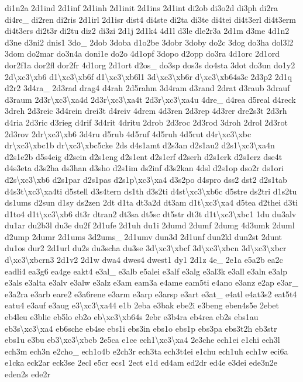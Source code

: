 {di1n2a 2d1ind 2d1inf 2d1inh 2d1init 2d1ins 2d1int di2ob di3o2d di3ph di2ra di4re\-\_\- di2ren di2ris 2d1irl 2d1isr dist4 di4ste di2ta di3te di4tei di4t3erl di4t3erm di4t3ers di2t3r di2tu diz2 di3zi 2d1j 2d1k4 4d1l d3le dle2r3a 2d1m d3me 4d1n2 d3ne d3ni2 dnis1 3do\-\_\- 2dob 3doba d1o2be 3dobr 3doby do2c 3dog do3ha dol3l2 3dom do2mar do3n4a doni1e do2o 4d1opf 3dopo d2opp do3ra 4d1orc 2d1ord dor2f1a dor2fl dor2fr 4d1org 2d1ort d2os\-\_\- do3sp dos3s do4sta 3dot do3un do1y2 2d\textbackslash{}xc3\textbackslash{}xb6 d1\textbackslash{}xc3\textbackslash{}xb6f d1\textbackslash{}xc3\textbackslash{}xb6l1 3d\textbackslash{}xc3\textbackslash{}xb6r d\textbackslash{}xc3\textbackslash{}xb64s3c 2d3p2 2d1q d2r2 3d4ra\-\_\- 2d3rad drag4 d4rah 2d5rahm 3d4ram d3rand 2drat d3raub 3drauf d3raum 2d3r\textbackslash{}xc3\textbackslash{}xa4d 2d3r\textbackslash{}xc3\textbackslash{}xa4t 2d3r\textbackslash{}xc3\textbackslash{}xa4u 4dre\-\_\- d4rea d5real d4reck 3dreh 2d3reic 3d4rein drei3t d4reiv 4drem 4d3ren 2d3rep 4d3rer dre2s3t 2d3rh d4ria 2d3ric d3rieg d4rif 3d4rit 4dritu 2drob 2d3roc 2d3rod 3droh 2drol 2d3rot 2d3rov 2dr\textbackslash{}xc3\textbackslash{}xb6 3d4ru d5rub 4d5ruf 4d5ruh 4d5rut d4r\textbackslash{}xc3\textbackslash{}xbc dr\textbackslash{}xc3\textbackslash{}xbc1b dr\textbackslash{}xc3\textbackslash{}xbc5cke 2ds d4s1amt d2s3an d2s1au2 d2s1\textbackslash{}xc3\textbackslash{}xa4n d2s1e2b d5s4eig d2sein d2s1eng d2s1ent d2s1erf d2serh d2s1erk d2s1erz dse4t d4s3eta d3s2ha ds3han d3sho d2s1im ds2inf d3s2kan 4dsl d2s1op dso2r ds1ori d2s\textbackslash{}xc3\textbackslash{}xb6 d2s1par d2s1pas d2s1p\textbackslash{}xc3\textbackslash{}xa4 d3s2po d4spro dss2 dst2 d2s1tab d4s3t\textbackslash{}xc3\textbackslash{}xa4ti d5stell d3s4tern ds1th d3s2ti d4st\textbackslash{}xc3\textbackslash{}xb6c d5stre ds2tri d1s2tu ds1ums d2sun d1sy ds2zen 2dt d1ta dt3a2d dt3am d1t\textbackslash{}xc3\textbackslash{}xa4 d5tea d2thei d3ti d1to4 d1t\textbackslash{}xc3\textbackslash{}xb6 dt3r dtran2 dt3sa dt5sc dt5str dt3t d1t\textbackslash{}xc3\textbackslash{}xbc1 1du du3alv du1ar du2b3l du3e du2f 2d1ufe 2d1uh du1i 2dumd 2dumf 2dumg 4d3umk 2duml d2ump 2dumr 2d1ums 3d2ums\-\_\- 2d1umv dun3d 2d1unf dun2kl dun2st 2dunt du1os dur2 2d1url du2s du3scha du3se 3d\textbackslash{}xc3\textbackslash{}xbcf 3d\textbackslash{}xc3\textbackslash{}xbcn 3d\textbackslash{}xc3\textbackslash{}xbcr d\textbackslash{}xc3\textbackslash{}xbcrn3 2d1v2 2d1w dwa4 dwes4 dwest1 dy1 2d1z 4e\-\_\- 2e1a e5a2b ea2c eadli4 ea3g6 ea4ge eakt4 e3al\-\_\- e3alb e5alei e3alf e3alg e3al3k e3all e3aln e3alp e3als e3alta e3alv e3alw e3alz e3am eam3a e4ame eam5ti e4ano e3anz e2ap e3ar\-\_\- e3a2ra e3arb eare2 e3a6rene e3arm e3arp e3arsp e3art e3at\-\_\- e4atl e4at3s2 eat5t4 eatu4 e3auf e3aug e3\textbackslash{}xc3\textbackslash{}xa44 e1b 2eba e3bak ebe2i e3beng eben4s5e 2ebet eb4leu e3blie eb5lo eb2o eb\textbackslash{}xc3\textbackslash{}xb64s 2ebr e3b4ra eb4rea eb2s ebs1au eb3s\textbackslash{}xc3\textbackslash{}xa4 eb6sche eb4se ebs1i ebs3in ebs1o ebs1p ebs3pa ebs3t2h eb3str ebs1u e3bu eb3\textbackslash{}xc3\textbackslash{}xbcb 2e5ca e1ce ech1\textbackslash{}xc3\textbackslash{}xa4 2e3che ech1ei e1chi ech3l ech3m ech3n e2cho\-\_\- ech1o4b e2ch3r ech3ta ech3t4ei e1chu ech1uh ech1w eci6a e1cka eck2ar eck3se 2ecl e5cr ecs1 2ect e1d ed4am ed2dr ed4e e3dei ede3n2e eden2s ede2r }
